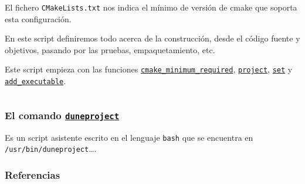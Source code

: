 




\begin{frame}[fragile]
	El fichero \lstinline{CMakeLists.txt} nos indica el mínimo de
	versión de cmake que soporta esta configuración.

	En este script definiremos todo acerca de la construcción, desde
	el código fuente y objetivos, pasando por las pruebas,
	empaquetamiento, etc.

	Este script empieza con las funciones
	\href{https://cmake.org/cmake/help/latest/command/cmake_minimum_required.html}{\lstinline{cmake_minimum_required}},
	\href{https://cmake.org/cmake/help/latest/command/project.html}{\lstinline{project}},
	\href{https://cmake.org/cmake/help/latest/command/set.html}{\lstinline{set}} y
	\href{https://cmake.org/cmake/help/latest/command/add_executable.html}{\lstinline{add_executable}}.
\end{frame}

\begin{frame}[fragile]

	\inputminted{cmake}{CMakeList.txt.sample}

\end{frame}

\begin{frame}
	\frametitle{
		El comando \href{https://gitlab.dune-project.org/core/dune-common/-/raw/master/bin/duneproject}{\lstinline{duneproject}}
	}

	Es un script asistente escrito en el lenguaje \lstinline{bash}
	que se encuentra en \lstinline{/usr/bin/duneproject}\ldots.

\end{frame}

\begin{frame}\transblindsvertical
	\frametitle{Referencias}
\end{frame}


